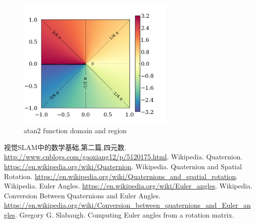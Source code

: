 \documentclass{article}
\begin{document}
\begin{figure}[!ht]
\centering
\includegraphics[width=3in]{figures/atan2.png}
\caption{atan2 function domain and region}
\label{fig:atan2}
\end{figure}


\begin{thebibliography}{99}
 视觉SLAM中的数学基础,第二篇,四元数. \url{http://www.cnblogs.com/gaoxiang12/p/5120175.html}.
 Wikipedia. Quaternion. \url{https://en.wikipedia.org/wiki/Quaternion}.
 Wikipedia. Quaternion and Spatial Rotation. \url{https://en.wikipedia.org/wiki/Quaternions_and_spatial_rotation}.
 Wikipedia. Euler Angles. \url{https://en.wikipedia.org/wiki/Euler_angles}.
 Wikipedia. Conversion Between Quaternions and Euler Angles. \url{https://en.wikipedia.org/wiki/Conversion_between_quaternions_and_Euler_angles}.
 Gregory G. Slabaugh. Computing Euler angles from a rotation matrix.
\end{thebibliography}
\end{document}
